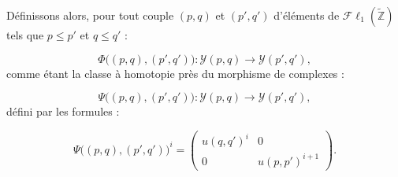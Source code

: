 Définissons alors, pour tout couple $(p,q)$ et $(p',q')$ d'éléments de
$\mathcal{F}\ell_1(\widetilde{\mathbb Z})$ tels que $p\leq p'$ et
$q\leq q'$ :

\begin{equation}
\Phi\bigl((p,q),(p',q')\bigr)\colon
\mathcal Y(p,q)\longrightarrow\mathcal Y(p',q'),
\tag{4.1.1.3}
\end{equation}
comme étant la classe à homotopie près du morphisme de complexes :

\begin{equation}
\Psi\bigl((p,q),(p',q')\bigr)\colon
\mathcal Y(p,q)\longrightarrow\mathcal Y(p',q'),
\tag{4.1.1.4}
\end{equation}
défini par les formules :

\begin{equation}
\Psi\bigl((p,q),(p',q')\bigr)^i
=
\begin{pmatrix}
u(q,q')^i & 0\\
0 & u(p,p')^{i+1}
\end{pmatrix}.
\tag{4.1.1.5}
\end{equation}
\endgroup
